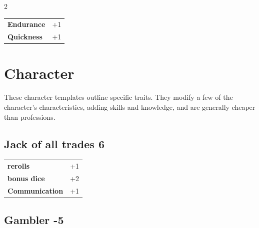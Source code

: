 \begin{multicols}{2}
\begin{tcolorbox}
\begin{tabular}{@{}ll@{}}
    \textbf{Endurance} & +1\\
    \textbf{Quickness} & +1\\
\end{tabular}


\end{tcolorbox}

\section{Character}

These character templates outline specific traits. They modify a few of the character's characteristics, adding skills and knowledge, and are generally cheaper than professions.

\begin{tcolorbox}
    \subsection*{Jack of all trades \hfill \small{6 }}
    \tcblower




\begin{tabular}{@{}ll@{}}
    \textbf{rerolls} & +1\\
    \textbf{bonus dice} & +2\\
    \textbf{Communication} & +1\\
\end{tabular}


\end{tcolorbox}

\begin{tcolorbox}
    \subsection*{Gambler \hfill \small{-5 }}
    \tcblower





\end{tcolorbox}
\end{multicols}

